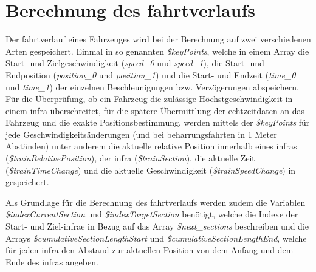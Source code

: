 \section{Berechnung des \Gls{fahrtverlauf}s} \label{kapitelFahrtverlauf}
Der \Gls{fahrtverlauf} eines Fahrzeuges wird bei der Berechnung auf zwei verschiedenen Arten gespeichert. Einmal in so genannten \textit{\$keyPoints}, welche in einem Array die Start- und Zielgeschwindigkeit (\textit{speed\_0} und \textit{speed\_1}), die Start- und Endposition (\textit{position\_0} und \textit{position\_1}) und die Start- und Endzeit (\textit{time\_0} und \textit{time\_1}) der einzelnen Beschleunigungen bzw. Verzögerungen abspeichern. Für die Überprüfung, ob ein Fahrzeug die zulässige Höchstgeschwindigkeit in einem \ac{infra} überschreitet, für die spätere Übermittlung der \Gls{echtzeitdaten} an das Fahrzeug und die exakte Positionsbestimmung, werden mittels der \textit{\$keyPoints} für jede Geschwindigkeitsänderungen (und bei \Gls{beharrungsfahrt}en in 1 Meter Abständen) unter anderem die aktuelle relative Position innerhalb eines \ac{infra}s (\textit{\$trainRelativePosition}), der \ac{infra} (\textit{\$trainSection}), die aktuelle Zeit (\textit{\$trainTimeChange}) und die aktuelle Geschwindigkeit (\textit{\$trainSpeedChange}) in gespeichert. 

Als Grundlage für die Berechnung des \Gls{fahrtverlauf}s werden zudem die Variablen \textit{\$indexCurrentSection} und \textit{\$indexTargetSection} benötigt, welche die Indexe der Start- und Ziel-\ac{infra}e in Bezug auf das Array \textit{\$next\_sections} beschreiben und die Arrays \textit{\$cumulativeSectionLengthStart} und \textit{\$cumulativeSectionLengthEnd}, welche für jeden \ac{infra} den Abstand zur aktuellen Position von dem Anfang und dem Ende des \ac{infra}s angeben.

